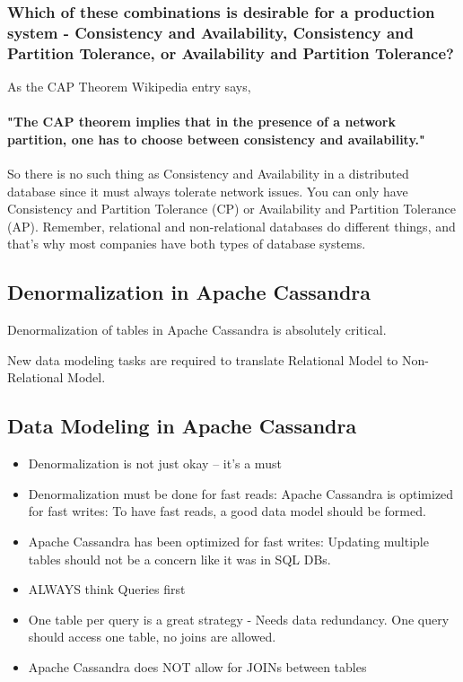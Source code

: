 \documentclass[
	paper=a4,%
	pagesize,%
	8pt, fleqn,%
	headings=small,%
	notitlepage,%
	parskip=never]%
	{scrreprt}
\begin{document}
\begin{multicols*}{3}
\subsubsection*{Which of these combinations is desirable for a production system - Consistency and Availability, Consistency and Partition Tolerance, or Availability and Partition Tolerance?}

As the CAP Theorem Wikipedia entry says, \paragraph{"The CAP theorem implies that in the presence of a network partition, one has to choose between consistency and availability."}

So there is no such thing as Consistency and Availability in a distributed database since it must always tolerate network issues. You can only have Consistency and Partition Tolerance (CP) or Availability and Partition Tolerance (AP). Remember, relational and non-relational databases do different things, and that's why most companies have both types of database systems.

\subsection{Denormalization in Apache Cassandra}
Denormalization of tables in Apache Cassandra is absolutely critical.

New data modeling tasks are required to translate Relational Model to Non-Relational Model.

\subsection*{Data Modeling in Apache Cassandra}
\begin{itemize}
\item Denormalization is not just okay -- it's a must
\item Denormalization must be done for fast reads: Apache Cassandra is optimized for fast writes: To have fast reads, a good data model should be formed.
\item Apache Cassandra has been optimized for fast writes: Updating multiple tables should not be a concern like it was in SQL DBs.
\item ALWAYS think Queries first
\item One table per query is a great strategy - Needs data redundancy. One query should access one table, no joins are allowed.
\item Apache Cassandra does NOT allow for JOINs between tables
\end{itemize}


\end{multicols*}
\end{document}
